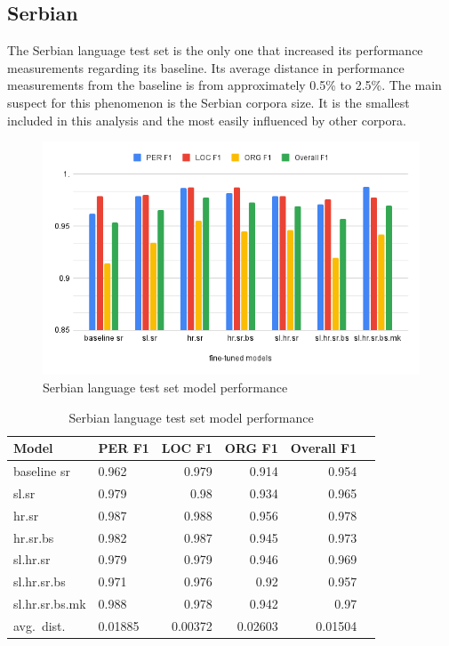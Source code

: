 \documentclass[sigconf]{acmart}
\begin{document}
\subsection{Serbian}
\label{subsec:serbian}
The Serbian language test set is the only one that increased its performance measurements regarding its baseline.
Its average distance in performance measurements from the baseline is from approximately 0.5\% to 2.5\%.
The main suspect for this phenomenon is the Serbian corpora size. %
It is the smallest included in this analysis and the most easily influenced by other corpora.
\begin{figure}[h]
  \centering
  \includegraphics[width=\linewidth]{eval_sr}
  \caption{Serbian language test set model performance}
  \label{fig:eval_sr}
\end{figure}

\begin{table}[H]
  \caption{Serbian language test set model performance}
  \label{tab:eval_sr}
  \begin{tabular}{llrrrr}
    \toprule
    Model&PER F1&LOC F1&ORG F1&Overall F1\\
    \midrule
    baseline sr&0.962&0.979&0.914&0.954\\
    \midrule
    sl.sr&0.979&0.98&0.934&0.965\\
    hr.sr&0.987&0.988&0.956&0.978\\
    hr.sr.bs&0.982&0.987&0.945&0.973\\
    sl.hr.sr&0.979&0.979&0.946&0.969\\
    sl.hr.sr.bs&0.971&0.976&0.92&0.957\\
    sl.hr.sr.bs.mk&0.988&0.978&0.942&0.97\\
    \midrule
    avg.\ dist.&0.01885&0.00372&0.02603&0.01504\\
    \bottomrule
  \end{tabular}
\end{table}
\end{document}
